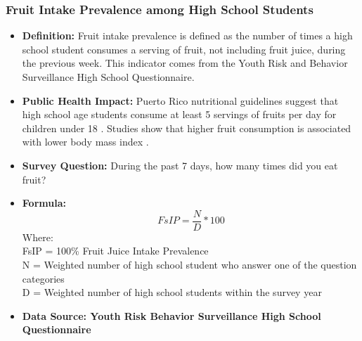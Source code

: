 \documentclass[12pt,letterpaper]{report}
\begin{document}
		\subsubsection{Fruit Intake Prevalence among High School Students} 
	\begin{itemize}
		\item \textbf{Definition:} Fruit intake prevalence is defined as the number of times a high school student consumes a serving of fruit, not including fruit juice, during the previous week. This indicator comes from the Youth Risk and Behavior Surveillance High School Questionnaire.
		\item \textbf{Public Health Impact:} Puerto Rico nutritional guidelines suggest that high school age students consume at least 5 servings of fruits per day for children under 18 \cite{GuiaAlimentariaPR}. Studies show that higher fruit consumption is associated with lower body mass index \cite{lin2002higher}.
		\item \textbf{Survey Question:} During the past 7 days, how many times did you eat fruit?
		\item \textbf{Formula:} 
			\begin{equation}
				FsIP = \frac{N}{D} * 100
			\end{equation}
Where: \\
			FsIP = 100\% Fruit Juice Intake Prevalence\\
			
			N = Weighted number of high school student who answer one of the question categories\\
			
			D = Weighted number of high school students within the survey year \\
			
		\item \textbf{Data Source: Youth Risk Behavior Surveillance High School Questionnaire}
	\end{itemize}

\end{document}
